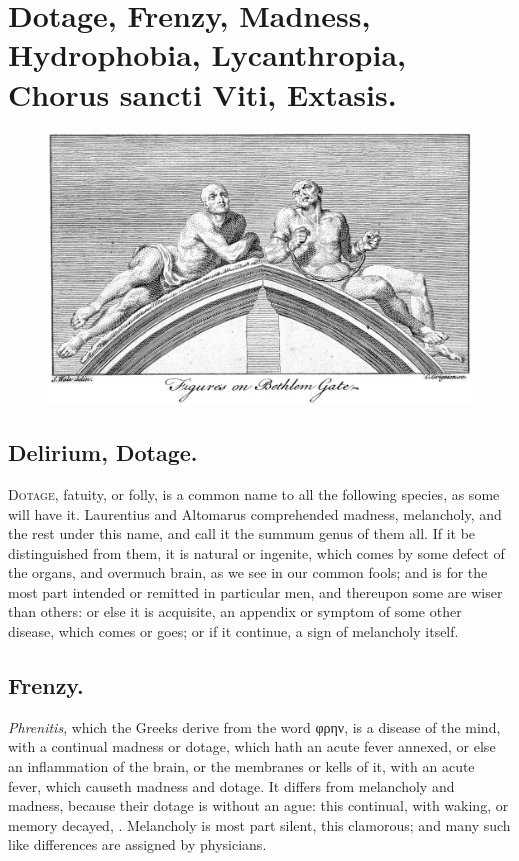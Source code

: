 {\section[Madness]{Dotage, Frenzy, Madness, Hydrophobia, Lycanthropia, Chorus sancti Viti, Extasis.}
\begin{figure}[H]
  \centering
  \includegraphics[keepaspectratio,width=\textwidth]{figures/tmczmfhz-small.jpg}
  \caption{}
  \label{fig:madness}
\end{figure}
\subsection{Delirium, Dotage.}
\lettrine{D}{otage}, fatuity, or folly, is a common name to all
the following species, as some will have it. Laurentius and 
Altomarus comprehended madness, melancholy, and the rest under this
name, and call it the summum genus of them all. If it be distinguished
from them, it is natural or ingenite, which comes by some defect of the
organs, and overmuch brain, as we see in our common fools; and is for
the most part intended or remitted in particular men, and thereupon
some are wiser than others: or else it is acquisite, an appendix or
symptom of some other disease, which comes or goes; or if it continue,
a sign of melancholy itself.

\subsection{Frenzy.}
\emph{Phrenitis}, which the Greeks derive from the word \textgreek{φρην}, is
a disease of the mind, with a continual madness or dotage, which hath
an acute fever annexed, or else an inflammation of the brain, or the
membranes or kells of it, with an acute fever, which causeth madness
and dotage. It differs from melancholy and madness, because their
dotage is without an ague: this continual, with waking, or memory
decayed, \etc{}. Melancholy is most part silent, this clamorous; and many
such like differences are assigned by physicians.

}
